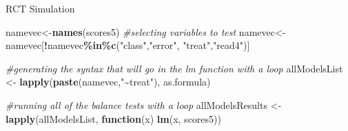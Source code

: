 \documentclass[
  ignorenonframetext,
]{beamer}
\newenvironment{Shaded}{\begin{snugshade}}{\end{snugshade}}
\newcommand{\CommentTok}[1]{\textcolor[rgb]{0.56,0.35,0.01}{\textit{#1}}}
\newcommand{\ControlFlowTok}[1]{\textcolor[rgb]{0.13,0.29,0.53}{\textbf{#1}}}
\newcommand{\KeywordTok}[1]{\textcolor[rgb]{0.13,0.29,0.53}{\textbf{#1}}}
\newcommand{\NormalTok}[1]{#1}
\newcommand{\OperatorTok}[1]{\textcolor[rgb]{0.81,0.36,0.00}{\textbf{#1}}}
\newcommand{\StringTok}[1]{\textcolor[rgb]{0.31,0.60,0.02}{#1}}
\begin{document}
\begin{frame}[fragile]{RCT Simulation}
\protect\hypertarget{rct-simulation-6}{}
\tiny

\begin{Shaded}
\begin{Highlighting}[]
\NormalTok{namevec\textless{}{-}}\KeywordTok{names}\NormalTok{(scores5)}
\CommentTok{\#selecting variables to test}
\NormalTok{namevec\textless{}{-}namevec[}\OperatorTok{!}\NormalTok{namevec}\OperatorTok{\%in\%}\KeywordTok{c}\NormalTok{(}\StringTok{"class"}\NormalTok{,}\StringTok{"error"}\NormalTok{, }\StringTok{"treat"}\NormalTok{,}\StringTok{"read4"}\NormalTok{)]}

\CommentTok{\#generating the syntax that will go in the lm function with a loop}
\NormalTok{allModelsList \textless{}{-}}\StringTok{ }\KeywordTok{lapply}\NormalTok{(}\KeywordTok{paste}\NormalTok{(namevec,}\StringTok{"\textasciitilde{}treat"}\NormalTok{), as.formula)}

\CommentTok{\#running all of the balance tests with a loop}
\NormalTok{allModelsResults \textless{}{-}}\StringTok{ }\KeywordTok{lapply}\NormalTok{(allModelsList, }\ControlFlowTok{function}\NormalTok{(x) }\KeywordTok{lm}\NormalTok{(x, scores5))  }
\end{Highlighting}
\end{Shaded}
\end{frame}
\end{document}
